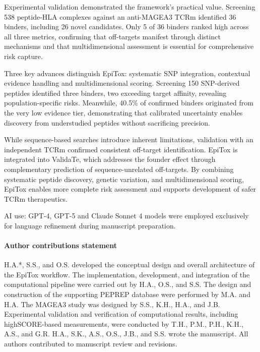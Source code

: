 \documentclass[times, twoside, watermark]{zHenriquesLab-StyleBioRxiv}
\begin{document}
    Experimental validation demonstrated the framework's practical value. Screening 538 peptide-HLA complexes against an anti-MAGEA3 TCRm identified 36 binders, including 26 novel candidates. Only 5 of 36 binders ranked high across all three metrics, confirming that off-targets manifest through distinct mechanisms and that multidimensional assessment is essential for comprehensive risk capture.

    Three key advances distinguish EpiTox: systematic SNP integration, contextual evidence handling and multidimensional scoring. Screening 150 SNP-derived peptides identified three binders, two exceeding target affinity, revealing population-specific risks. Meanwhile, 40.5\% of confirmed binders originated from the very low evidence tier, demonstrating that calibrated uncertainty enables discovery from understudied peptides without sacrificing precision.

    While sequence-based searches introduce inherent limitations, validation with an independent TCRm confirmed consistent off-target identification. EpiTox is integrated into ValidaTe, which addresses the founder effect through complementary prediction of sequence-unrelated off-targets. By combining systematic peptide discovery, genetic variation, and multidimensional scoring, EpiTox enables more complete risk assessment and supports development of safer TCRm therapeutics.

\begin{acknowledgements}
AI use: GPT-4, GPT-5 and Claude Sonnet 4 models were employed exclusively for language refinement during manuscript preparation.
\end{acknowledgements}

\paragraph{Author contributions statement}
    H.A.*, S.S., and O.S. developed the conceptual design and overall architecture of the EpiTox workflow. The implementation, development, and integration of the computational pipeline were carried out by H.A., O.S., and S.S. The design and construction of the supporting PEPREP database were performed by M.A. and H.A. The MAGEA3 study was designed by S.S., K.H., H.A., and J.B. Experimental validation and verification of computational results, including highSCORE-based measurements, were conducted by T.H., P.M., P.H., K.H., A.S., and G.R. H.A., S.K., A.S., O.S., J.B., and S.S. wrote the manuscript. All authors contributed to manuscript review and revisions.
    
\end{document}
